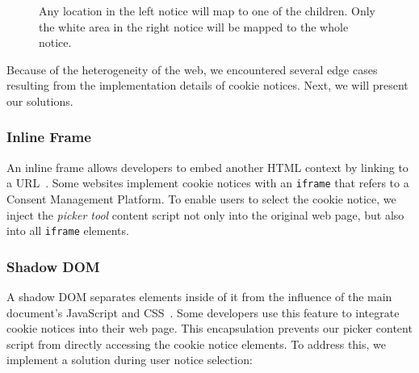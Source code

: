 \begin{figure}
	\centering
	\begin{minipage}{0.48\textwidth}
		\centering
	\end{minipage}\hfill
	\begin{minipage}{0.48\textwidth}
		\centering
	\end{minipage}
	\caption{Any location in the left notice will map to one of the children. Only the white area in the right notice will be mapped to the whole notice.}
	\label{fig:notice-fillout}
\end{figure}

Because of the heterogeneity of the web, we encountered several edge cases resulting from the implementation details of cookie notices. 
Next, we will present our solutions.

\subsubsection{Inline Frame}
An inline frame allows developers to embed another HTML context by linking to a URL~\cite{iframeMdn}.
Some websites implement cookie notices with an \verb|iframe| that refers to a Consent Management Platform.
To enable users to select the cookie notice, we inject the \emph{picker tool} content script not only into the original web page, but also into all \verb|iframe| elements.

\subsubsection{Shadow DOM}
A shadow DOM separates elements inside of it from the influence of the main document's JavaScript and CSS~\cite{shadowDomMdn}.
Some developers use this feature to integrate cookie notices into their web page.
This encapsulation prevents our picker content script from directly accessing the cookie notice elements. 
To address this, we implement a solution during user notice selection:

